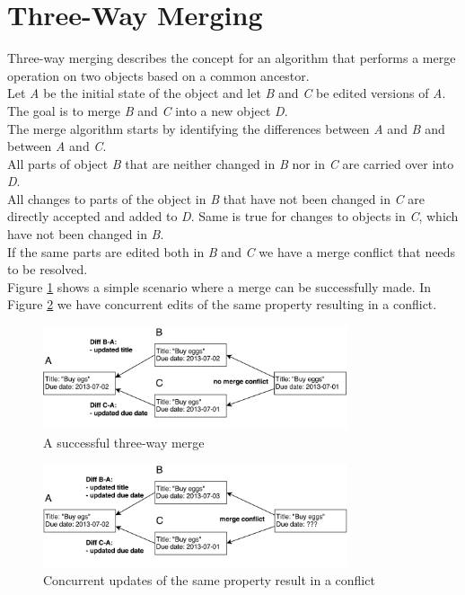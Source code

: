 \section{Three-Way Merging}
\label{sec:background.merging}
Three-way merging describes the concept for an algorithm that performs a merge operation on two objects based on a common ancestor.\\
Let \emph{A} be the initial state of the object and let \emph{B} and \emph{C} be edited versions of \emph{A}.
The goal is to merge \emph{B} and \emph{C} into a new object \emph{D}.\\
The merge algorithm starts by identifying the differences between \emph{A} and \emph{B} and between \emph{A} and \emph{C}.\\
All parts of object \emph{B} that are neither changed in \emph{B} nor in \emph{C} are carried over into \emph{D}.\\
All changes to parts of the object in \emph{B} that have not been changed in \emph{C} are directly accepted and added to \emph{D}.
Same is true for changes to objects in \emph{C}, which have not been changed in \emph{B}.\\
If the same parts are edited both in \emph{B} and \emph{C} we have a merge conflict that needs to be resolved.\\
Figure \ref{fig:background.merging.success} shows a simple scenario where a merge can be successfully made.
In Figure \ref{fig:background.merging.conflict} we have concurrent edits of the same property resulting in a conflict.\\
\begin{figure}[H]
  \centering
  \includegraphics[width=0.8\textwidth]{img/three-way-merging}
  \caption{A successful three-way merge}
  \label{fig:background.merging.success}
\end{figure}
\begin{figure}[H]
  \centering
  \includegraphics[width=0.8\textwidth]{img/three-way-merging-conflict}
  \caption{Concurrent updates of the same property result in a conflict}
  \label{fig:background.merging.conflict}
\end{figure}
